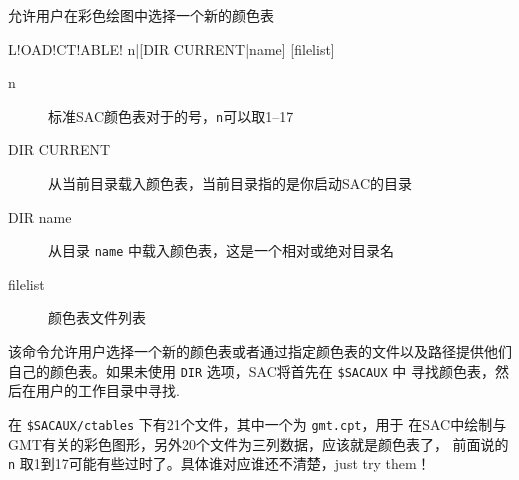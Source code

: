 \label{cmd:loadctable}

允许用户在彩色绘图中选择一个新的颜色表

\begin{SACSTX}
L!OAD!CT!ABLE! n|[DIR CURRENT|name] [filelist]
\end{SACSTX}

\begin{description}
\item [n] 标准SAC颜色表对于的号，\texttt{n}可以取1--17
\item [DIR CURRENT] 从当前目录载入颜色表，当前目录指的是你启动SAC的目录
\item [DIR name] 从目录 \texttt{name} 中载入颜色表，这是一个相对或绝对目录名
\item [filelist] 颜色表文件列表
\end{description}

该命令允许用户选择一个新的颜色表或者通过指定颜色表的文件以及路径提供他们
自己的颜色表。如果未使用 \texttt{DIR} 选项，SAC将首先在 \verb|$SACAUX| 中
寻找颜色表，然后在用户的工作目录中寻找.

在 \verb|$SACAUX/ctables| 下有21个文件，其中一个为 \texttt{gmt.cpt}，用于
在SAC中绘制与GMT有关的彩色图形，另外20个文件为三列数据，应该就是颜色表了，
前面说的 \texttt{n} 取1到17可能有些过时了。具体谁对应谁还不清楚，just try them！
